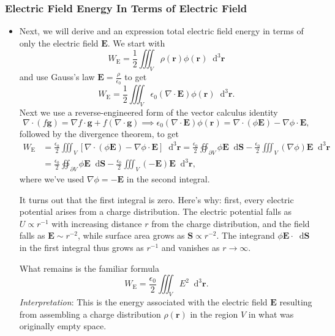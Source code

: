 \documentclass[11pt, a4paper]{article}
\newcommand{\diff}{\mathop{}\!\mathrm{d}} %
\newcommand{\dr}{\diff^{3} \r}  %
\renewcommand{\vec}[1]{\bm{#1}} %
\renewcommand{\r}{\vec{r}}
\newcommand{\E}{\vec{E}} %
\newcommand{\ee}{\epsilon_{0}}  %
\renewcommand{\div}{\nabla \cdot}
\renewcommand{\grad}{\nabla}
\begin{document}
\subsubsection{Electric Field Energy In Terms of Electric Field}
\begin{itemize}
	\item Next, we will derive and an expression total electric field energy in terms of only the electric field $ \E $. We start with
	\begin{equation*}
		W_{\text{E}} = \frac{1}{2} \iiint_{V} \rho(\r) \phi(\r) \dr
	\end{equation*}
	and use Gauss's law $ \E = \frac{\rho}{\ee} $ to get
	\begin{equation*}
		W_{\text{E}}  = \frac{1}{2} \iiint_{V} \ee (\div \E) \phi(\r) \dr.
	\end{equation*}
	Next we use a reverse-engineered form of the vector calculus identity 
	\begin{equation*}
		\div (f \vec{g}) = \grad f \cdot \vec{g} + f (\div \vec{g}) \implies \ee (\div \E) \phi(\r) = \div (\phi \E) - \grad \phi \cdot \E,
	\end{equation*}
	followed by the divergence theorem, to get
	\begin{align*}
		W_{\text{E}} &= \frac{\ee}{2} \iiint_{V}\left[\div (\phi \E) - \grad \phi \cdot \E\right] \dr = \frac{\ee}{2} \oiint_{\partial V} \phi \E \diff \vec{S} - \frac{\ee}{2} \iiint_{V} (\grad \phi) \E \dr\\
		& =  \frac{\ee}{2} \oiint_{\partial V} \phi \E \diff \vec{S} - \frac{\ee}{2} \iiint_{V} (- \E) \E \dr,
	\end{align*}
	where we've used $ \grad \phi = - \E $ in the second integral. 
	
	It turns out that the first integral is zero. Here's why: first, every electric potential arises from a  charge distribution. The electric potential falls as $ U \propto r^{-1} $ with increasing distance $ r $ from the charge distribution, and the field falls as $ \E \sim r^{-2} $, while surface area grows as $ \vec{S} \propto r^{-2} $. The integrand  $ \phi \E \cdot \diff \vec{S} $ in the first integral thus grows as $ r^{-1} $ and vanishes as $ r \to \infty $. 
	
	What remains is the familiar formula
	\begin{equation*}
		W_{\text{E}} = \frac{\ee}{2} \iiint_{V} E^{2} \dr.
	\end{equation*} 
	\textit{Interpretation}: This is the energy associated with the electric field $ \E $ resulting from assembling a charge distribution $ \rho(\r) $ in the region $ V $ in what was originally empty space.

\end{itemize}
\end{document}
